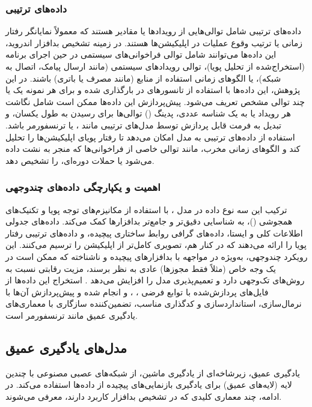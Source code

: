 \subsubsection{داده‌های ترتیبی}
داده‌های ترتیبی شامل توالی‌هایی از رویدادها یا مقادیر هستند که معمولاً نمایانگر رفتار زمانی یا ترتیب وقوع عملیات در اپلیکیشن‌ها هستند. در زمینه تشخیص بدافزار اندروید، این داده‌ها می‌توانند شامل توالی فراخوانی‌های  سیستمی در حین اجرای برنامه (استخراج‌شده از تحلیل پویا)، توالی رویدادهای سیستمی (مانند ارسال پیامک، اتصال به شبکه)، یا الگوهای زمانی استفاده از منابع (مانند مصرف  یا باتری) باشند. در این پژوهش، این داده‌ها با استفاده از تانسورهای  در  بارگذاری شده و برای هر نمونه یک یا چند توالی مشخص تعریف می‌شود. پیش‌پردازش این داده‌ها ممکن است شامل نگاشت هر رویداد یا  به یک شناسه عددی، پدینگ () توالی‌ها برای رسیدن به طول یکسان، و تبدیل به فرمت قابل پردازش توسط مدل‌های ترتیبی مانند ،  یا ترنسفورمر باشد. استفاده از داده‌های ترتیبی به مدل امکان می‌دهد تا رفتار پویای اپلیکیشن‌ها را تحلیل کند و الگوهای زمانی مخرب، مانند توالی خاصی از فراخوانی‌ها که منجر به نشت داده می‌شود یا حملات دوره‌ای، را تشخیص دهد.

\subsubsection{اهمیت و یکپارچگی داده‌های چندوجهی}
ترکیب این سه نوع داده در مدل ، با استفاده از مکانیزم‌های توجه پویا و تکنیک‌های همجوشی ()، به شناسایی دقیق‌تر و جامع‌تر بدافزارها کمک می‌کند. داده‌های جدولی اطلاعات کلی و ایستا، داده‌های گرافی روابط ساختاری پیچیده، و داده‌های ترتیبی رفتار پویا را ارائه می‌دهند که در کنار هم، تصویری کامل‌تر از اپلیکیشن را ترسیم می‌کنند. این رویکرد چندوجهی، به‌ویژه در مواجهه با بدافزارهای پیچیده و ناشناخته که ممکن است در یک وجه خاص (مثلاً فقط مجوزها) عادی به نظر برسند، مزیت رقابتی نسبت به روش‌های تک‌وجهی دارد و تعمیم‌پذیری مدل را افزایش می‌دهد \cite{Marastoni2022}. استخراج این داده‌ها از فایل‌های پردازش‌شده با توابع فرضی ، ، و  انجام شده و پیش‌پردازش آن‌ها با نرمال‌سازی، استانداردسازی و کدگذاری مناسب، تضمین‌کننده سازگاری با معماری‌های یادگیری عمیق مانند ترنسفورمر است.

\subsection{مدل‌های یادگیری عمیق}
یادگیری عمیق، زیرشاخه‌ای از یادگیری ماشین، از شبکه‌های عصبی مصنوعی با چندین لایه (لایه‌های عمیق) برای یادگیری بازنمایی‌های پیچیده از داده‌ها استفاده می‌کند. در ادامه، چند معماری کلیدی که در تشخیص بدافزار کاربرد دارند، معرفی می‌شوند.

